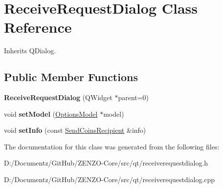 \hypertarget{class_receive_request_dialog}{}\section{Receive\+Request\+Dialog Class Reference}
\label{class_receive_request_dialog}


Inherits Q\+Dialog.

\subsection*{Public Member Functions}
\begin{DoxyCompactItemize}
\item 
\mbox{\label{class_receive_request_dialog_afb469cd7a503978ef5e212aa660ab950}} 
{\bfseries Receive\+Request\+Dialog} (Q\+Widget $\ast$parent=0)
\item 
\mbox{\label{class_receive_request_dialog_ad57b3bf409346660842360836fd8569d}} 
void {\bfseries set\+Model} (\mbox{\hyperlink{class_options_model}{Options\+Model}} $\ast$model)
\item 
\mbox{\label{class_receive_request_dialog_a43344270ef71e68ad9c7a931cc0ca9ed}} 
void {\bfseries set\+Info} (const \mbox{\hyperlink{class_send_coins_recipient}{Send\+Coins\+Recipient}} \&info)
\end{DoxyCompactItemize}


The documentation for this class was generated from the following files\+:\begin{DoxyCompactItemize}
\item 
D\+:/\+Documentz/\+Git\+Hub/\+Z\+E\+N\+Z\+O-\/\+Core/src/qt/receiverequestdialog.\+h\item 
D\+:/\+Documentz/\+Git\+Hub/\+Z\+E\+N\+Z\+O-\/\+Core/src/qt/receiverequestdialog.\+cpp\end{DoxyCompactItemize}
